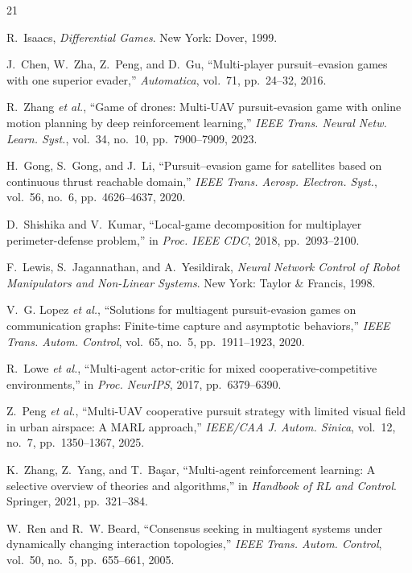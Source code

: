 \documentclass[conference]{IEEEtran}
\begin{document}
\begin{thebibliography}{21}

R.~Isaacs, \emph{Differential Games}. New York: Dover, 1999.

J.~Chen, W.~Zha, Z.~Peng, and D.~Gu, ``Multi-player pursuit--evasion games with one superior evader,'' \emph{Automatica}, vol.~71, pp.~24--32, 2016.

R.~Zhang \emph{et al.}, ``Game of drones: Multi-UAV pursuit-evasion game with online motion planning by deep reinforcement learning,'' \emph{IEEE Trans. Neural Netw. Learn. Syst.}, vol.~34, no.~10, pp.~7900--7909, 2023.

H.~Gong, S.~Gong, and J.~Li, ``Pursuit--evasion game for satellites based on continuous thrust reachable domain,'' \emph{IEEE Trans. Aerosp. Electron. Syst.}, vol.~56, no.~6, pp.~4626--4637, 2020.

D.~Shishika and V.~Kumar, ``Local-game decomposition for multiplayer perimeter-defense problem,'' in \emph{Proc. IEEE CDC}, 2018, pp.~2093--2100.

F.~Lewis, S.~Jagannathan, and A.~Yesildirak, \emph{Neural Network Control of Robot Manipulators and Non-Linear Systems}. New York: Taylor \& Francis, 1998.

V.~G. Lopez \emph{et al.}, ``Solutions for multiagent pursuit-evasion games on communication graphs: Finite-time capture and asymptotic behaviors,'' \emph{IEEE Trans. Autom. Control}, vol.~65, no.~5, pp.~1911--1923, 2020.

R.~Lowe \emph{et al.}, ``Multi-agent actor-critic for mixed cooperative-competitive environments,'' in \emph{Proc. NeurIPS}, 2017, pp.~6379--6390.

Z.~Peng \emph{et al.}, ``Multi-UAV cooperative pursuit strategy with limited visual field in urban airspace: A MARL approach,'' \emph{IEEE/CAA J. Autom. Sinica}, vol.~12, no.~7, pp.~1350--1367, 2025.

K.~Zhang, Z.~Yang, and T.~Ba\c{s}ar, ``Multi-agent reinforcement learning: A selective overview of theories and algorithms,'' in \emph{Handbook of RL and Control}. Springer, 2021, pp.~321--384.

W.~Ren and R.~W. Beard, ``Consensus seeking in multiagent systems under dynamically changing interaction topologies,'' \emph{IEEE Trans. Autom. Control}, vol.~50, no.~5, pp.~655--661, 2005.


\end{thebibliography}
\end{document}
